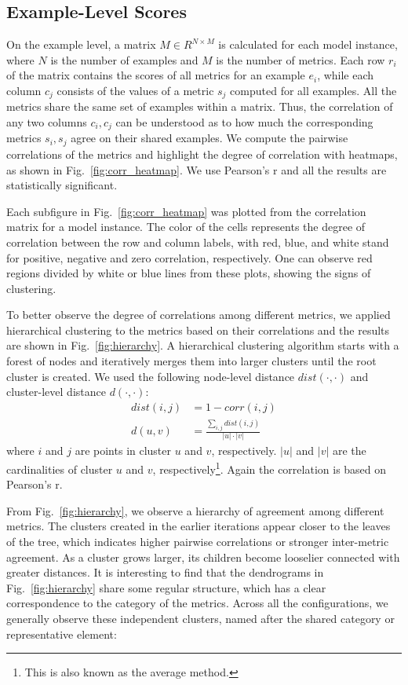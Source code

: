 \documentclass[conference]{IEEEtran}
\begin{document}
\subsection{Example-Level Scores}
On the example level, a matrix $M \in R^{N \times M}$ is calculated for each model instance, where $N$ is the number of examples and $M$ is the number of metrics.
Each row $r_i$ of the matrix contains the scores of all metrics for an example $e_i$, while each column $c_j$ consists of the values of a metric $s_j$ computed for all examples.
All the metrics share the same set of examples within a matrix.
Thus, the correlation of any two columns $c_i, c_j$ can be understood as to how much the corresponding metrics $s_i, s_j$ agree on their shared examples.
We compute the pairwise correlations of the metrics and highlight the degree of correlation with heatmaps, as shown in Fig.~\ref{fig:corr_heatmap}.
We use Pearson's r and all the results are statistically significant.



Each subfigure in Fig.~\ref{fig:corr_heatmap} was plotted from the correlation matrix for a model instance.
The color of the cells represents the degree of correlation between the row and column labels, with red, blue, and white stand for positive, negative and zero correlation, respectively.
One can observe red regions divided by white or blue lines from these plots, showing the signs of clustering.

To better observe the degree of correlations among different metrics, we applied hierarchical clustering to the metrics based on their correlations and the results are shown in Fig.~\ref{fig:hierarchy}.
A hierarchical clustering algorithm starts with a forest of nodes and iteratively merges them into larger clusters until the root cluster is created.
We used the following node-level distance $\textit{dist}(\cdot, \cdot)$ and cluster-level distance $d(\cdot, \cdot)$:
\begin{align}
    \textit{dist}(i, j) &= 1 - \textit{corr}(i, j) \\
    d(u, v) &= \frac{\sum_{i,j}\textit{dist}(i, j)}{|u| \cdot |v|}
\end{align}
where $i$ and $j$ are points in cluster $u$ and $v$, respectively. $|u|$ and $|v|$ are the cardinalities of cluster $u$ and $v$, respectively\footnote{This is also known as the average method.}. Again the correlation is based on Pearson's r.


From Fig.~\ref{fig:hierarchy}, we observe a hierarchy of agreement among different metrics.
The clusters created in the earlier iterations appear closer to the leaves of the tree, which indicates higher pairwise correlations or stronger inter-metric agreement.
As a cluster grows larger, its children become looselier connected with greater distances.
It is interesting to find that the dendrograms in Fig.~\ref{fig:hierarchy} share some regular structure, which has a clear correspondence to the category of the metrics. Across all the configurations, we generally observe these independent clusters, named after the shared category or representative element:
\end{document}
